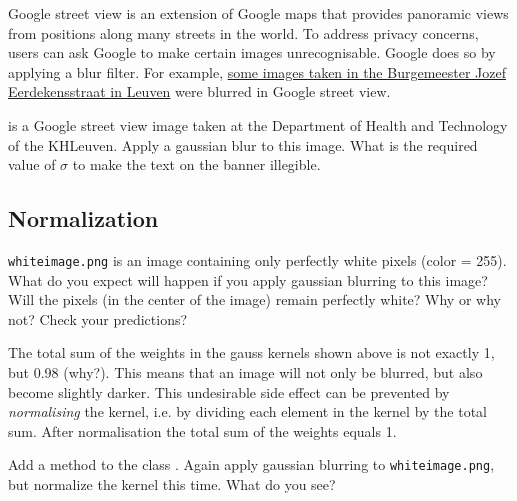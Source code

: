 \documentclass{book}
\begin{document}
\begin{exercise}
Google street view is an extension of Google maps that provides panoramic views from positions along many streets in the world. To address privacy concerns, users can ask Google to make certain images unrecognisable. Google does so by applying a blur filter. For example, \href{http://maps.google.be/?ll=50.86546,4.700148&spn=0.0014,0.00246&t=m&layer=c&cbll=50.865564,4.700181&panoid=2s4kQDqWdj96P1mRHbEahQ&cbp=12,229.38,,0,-4.81&z=19}{some images taken in the Burgemeester Jozef Eerdekensstraat in Leuven} were blurred in Google street view.

 is a Google street view image taken at the Department of Health and Technology of the KHLeuven. Apply a gaussian blur to this image. What is the required value of $\sigma$ to make the text on the banner illegible.  
\end{exercise}


\subsection{Normalization}

\begin{exercise}
\texttt{whiteimage.png} is an image containing only perfectly white pixels (color = 255). What do you expect will happen if you apply gaussian blurring to this image? Will the pixels (in the center of the image) remain perfectly white? Why or why not? Check your predictions? 
\end{exercise}

The total sum of the weights in the gauss kernels shown above is not exactly 1, but 0.98 (why?). This means that an image will not only be blurred, but also become slightly darker. This undesirable side effect can be prevented by \emph{normalising} the kernel, i.e. by dividing each element in the kernel by the total sum. After normalisation the total sum of the weights equals 1.   

\begin{exercise}
Add a method  to the class . Again apply gaussian blurring to \texttt{whiteimage.png}, but normalize the kernel this time. What do you see? 
\end{exercise}
\end{document}
